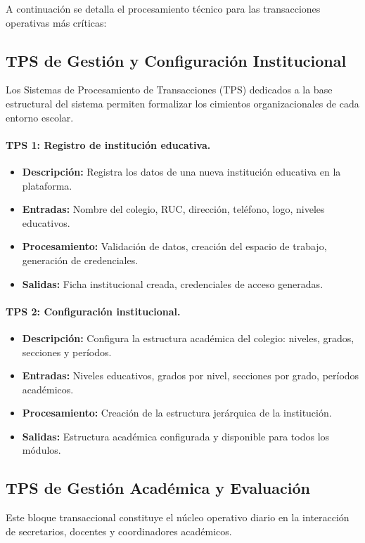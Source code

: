 \documentclass[12pt,a4paper,oneside]{report}
\begin{document}
A continuación se detalla el procesamiento técnico para las transacciones operativas más críticas:

\subsection{TPS de Gestión y Configuración Institucional}
Los Sistemas de Procesamiento de Transacciones (TPS) dedicados a la base estructural del sistema permiten formalizar los cimientos organizacionales de cada entorno escolar.

\paragraph{TPS 1: Registro de institución educativa.}
\begin{itemize}
    \item \textbf{Descripción:} Registra los datos de una nueva institución educativa en la plataforma.
    \item \textbf{Entradas:} Nombre del colegio, RUC, dirección, teléfono, logo, niveles educativos.
    \item \textbf{Procesamiento:} Validación de datos, creación del espacio de trabajo, generación de credenciales.
    \item \textbf{Salidas:} Ficha institucional creada, credenciales de acceso generadas.
\end{itemize}

\paragraph{TPS 2: Configuración institucional.}
\begin{itemize}
    \item \textbf{Descripción:} Configura la estructura académica del colegio: niveles, grados, secciones y períodos.
    \item \textbf{Entradas:} Niveles educativos, grados por nivel, secciones por grado, períodos académicos.
    \item \textbf{Procesamiento:} Creación de la estructura jerárquica de la institución.
    \item \textbf{Salidas:} Estructura académica configurada y disponible para todos los módulos.
\end{itemize}

\subsection{TPS de Gestión Académica y Evaluación}
Este bloque transaccional constituye el núcleo operativo diario en la interacción de secretarios, docentes y coordinadores académicos.
\end{document}
